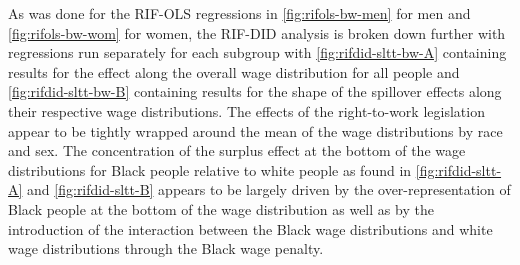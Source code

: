 \documentclass[11pt]{article}
\begin{document}
As was done for the RIF-OLS regressions in \autoref{fig:rifols-bw-men} for men and \autoref{fig:rifols-bw-wom} for women, the RIF-DID analysis is broken down further with regressions run separately for each subgroup with \autoref{fig:rifdid-sltt-bw-A} containing results for the effect along the overall wage distribution for all people and \autoref{fig:rifdid-sltt-bw-B} containing results for the shape of the spillover effects along their respective wage distributions. The effects of the right-to-work legislation appear to be tightly wrapped around the mean of the wage distributions by race and sex. The concentration of the surplus effect at the bottom of the wage distributions for Black people relative to white people as found in \autoref{fig:rifdid-sltt-A} and \autoref{fig:rifdid-sltt-B} appears to be largely driven by the over-representation of Black people at the bottom of the wage distribution as well as by the introduction of the interaction between the Black wage distributions and white wage distributions through the Black wage penalty.

\end{document}
